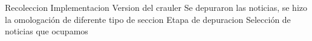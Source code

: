 	Recoleccion
		Implementacion
		Version del crauler 
		Se depuraron las noticias, se hizo la omologación de diferente tipo de seccion
		Etapa de depuracion
		Selección de noticias que ocupamos